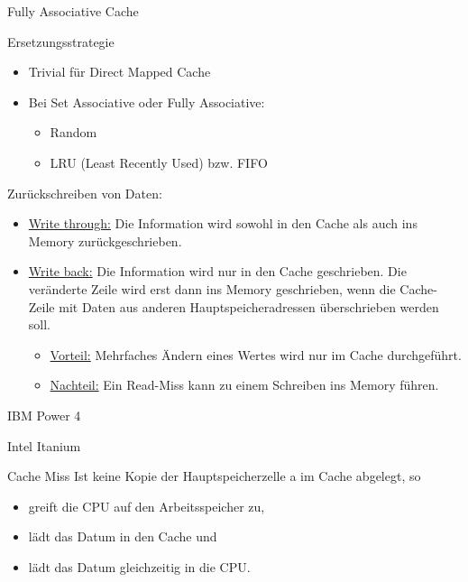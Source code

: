 \begin{defi}{Fully Associative Cache}
    
\end{defi}

\begin{defi}{Ersetzungsstrategie}
    \begin{itemize}
        \item Trivial für Direct Mapped Cache
        \item Bei Set Associative oder Fully Associative:
        \begin{itemize}
            \item Random
            \item LRU (Least Recently Used) bzw. FIFO
        \end{itemize}
    \end{itemize}
    Zurückschreiben von Daten:
    \begin{itemize}
        \item \underline{Write through:} Die Information wird sowohl in den Cache als auch ins
        Memory zurückgeschrieben.
        \item \underline{Write back:} Die Information wird nur in den Cache geschrieben. Die
        veränderte Zeile wird erst dann ins Memory geschrieben, wenn die
        Cache-Zeile mit Daten aus anderen Hauptspeicheradressen
        überschrieben werden soll.
        \begin{itemize}
            \item \underline{Vorteil:} Mehrfaches Ändern eines Wertes wird nur im Cache durchgeführt.
            \item \underline{Nachteil:} Ein Read-Miss kann zu einem Schreiben ins Memory führen.
        \end{itemize}
    \end{itemize}
\end{defi}

\begin{bonus}[Cache]{IBM Power 4}
    
\end{bonus}

\begin{bonus}[Cache]{Intel Itanium}
    
\end{bonus}

\begin{defi}{Cache Miss}
    Ist keine Kopie der Hauptspeicherzelle a im Cache abgelegt, so 
    \begin{itemize}
        \item greift die CPU auf den Arbeitsspeicher zu,
        \item lädt das Datum in den Cache und
        \item lädt das Datum gleichzeitig in die CPU.
    \end{itemize}
\end{defi}

